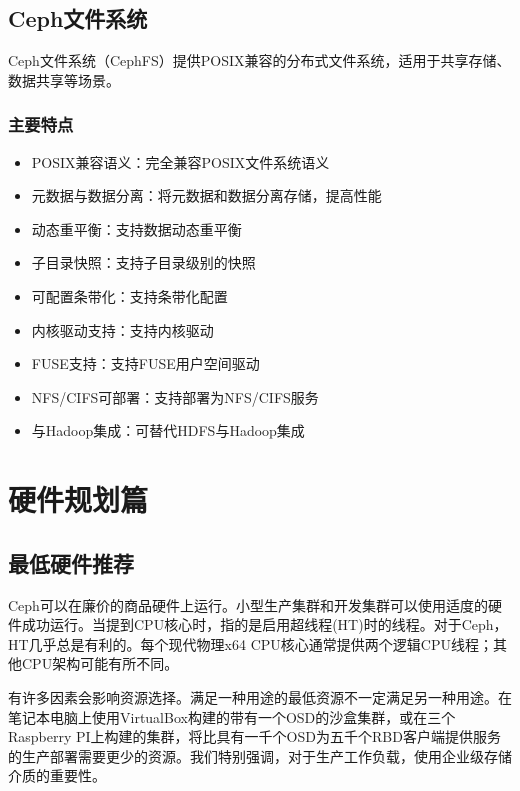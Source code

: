 \documentclass[12pt,UTF8]{ctexbook}
\begin{document}
\section{Ceph文件系统}

Ceph文件系统（CephFS）提供POSIX兼容的分布式文件系统，适用于共享存储、数据共享等场景。

\subsection{主要特点}

\begin{itemize}[leftmargin=2cm]
	\item POSIX兼容语义：完全兼容POSIX文件系统语义
	\item 元数据与数据分离：将元数据和数据分离存储，提高性能
	\item 动态重平衡：支持数据动态重平衡
	\item 子目录快照：支持子目录级别的快照
	\item 可配置条带化：支持条带化配置
	\item 内核驱动支持：支持内核驱动
	\item FUSE支持：支持FUSE用户空间驱动
	\item NFS/CIFS可部署：支持部署为NFS/CIFS服务
	\item 与Hadoop集成：可替代HDFS与Hadoop集成
\end{itemize}

\chapter{硬件规划篇}
\section{最低硬件推荐}
Ceph可以在廉价的商品硬件上运行。小型生产集群和开发集群可以使用适度的硬件成功运行。当提到CPU核心时，指的是启用超线程(HT)时的线程。对于Ceph，HT几乎总是有利的。每个现代物理x64 CPU核心通常提供两个逻辑CPU线程；其他CPU架构可能有所不同。

有许多因素会影响资源选择。满足一种用途的最低资源不一定满足另一种用途。在笔记本电脑上使用VirtualBox构建的带有一个OSD的沙盒集群，或在三个Raspberry PI上构建的集群，将比具有一千个OSD为五千个RBD客户端提供服务的生产部署需要更少的资源。我们特别强调，对于生产工作负载，使用企业级存储介质的重要性。
\end{document}
